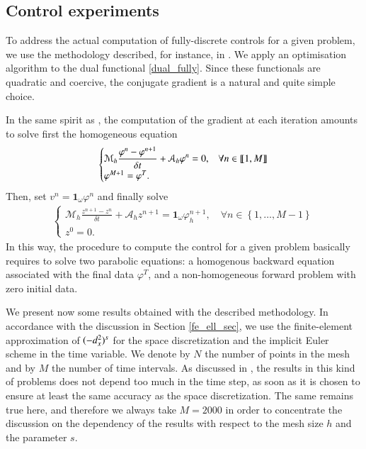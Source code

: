 \subsection{Control experiments}
%
To address the actual computation of fully-discrete controls for a given problem, we use the methodology described, for instance, in \cite{glowinski2008exact}. We apply an optimisation algorithm to the dual functional \eqref{dual_fully}. Since these functionals are quadratic and coercive, the conjugate gradient is a natural and quite simple choice.

In the same spirit as \cite{boyer2013penalised}, the computation of the gradient at each iteration amounts to solve first the homogeneous equation 
%
\begin{align}
	\begin{cases}
		\displaystyle\mathcal M_h \frac{\varphi^n-\varphi^{n+1}}{\delta t}+\mathcal A_h \varphi^n=0, & \forall n\in\llbracket 1,M\rrbracket
		\\
		\varphi^{M+1}=\varphi^T. 
	\end{cases}
\end{align}
%
Then, set $v^n=\mathbf{1}_\omega\varphi^n$ and finally solve 
%
\begin{align}\label{frac_heat_num}
	\begin{cases}
		\displaystyle\mathcal M_h \frac{z^{n+1}-z^n}{\delta t}+\mathcal A_h z^{n+1}=\mathbf{1}_\omega \varphi_h^{n+1}, \quad \forall n\in \left\{1,\ldots,M-1\right\}
		\\
		z^0=0. 
	\end{cases}
\end{align}
%
In this way, the procedure to compute the control for a given problem basically requires to solve two parabolic equations: a homogenous backward equation associated with the final data $\varphi^T$, and a non-homogeneous forward problem with zero initial data. 

We present now some results obtained with the described methodology. In accordance with the discussion in Section \ref{fe_ell_sec}, we use the finite-element approximation of $(-d_x^2)^{s}$ for the space discretization and the implicit Euler scheme in the time variable. We denote by $N$ the number of points in the mesh and by $M$ the number of time intervals. As discussed in \cite{boyer2013penalised}, the results in this kind of problems does not depend too much in the time step, as soon as it is chosen to ensure at least the same accuracy as the space discretization. The same remains true here, and therefore we always take $M=2000$ in order to concentrate the discussion on the dependency of the results with respect to the mesh size $h$ and the parameter $s$.

